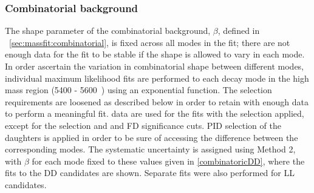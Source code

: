 \subsubsection{Combinatorial background}

The shape parameter of the combinatorial background, $\beta$, defined in \sect~\ref{sec:massfit:combinatorial}, is fixed across all \Dz modes in the \CP fit; there are not enough data for the fit to be stable if the shape is allowed to vary in each mode. In order ascertain the variation in combinatorial shape between different \Dz modes, individual maximum likelihood fits are performed to each \Dz decay mode in the high \Bm mass region (5400 - 5600~\mevcc) using an exponential function. The selection requirements are loosened as described below in order to retain with enough data to perform a meaningful fit. \runone data are used for the fits with the selection applied, except for the \Kstarm selection and \Dz and \KS FD significance cuts. PID selection of the \Dz daughters is applied in order to be sure of accessing the difference between the corresponding \Dz modes. The systematic uncertainty is assigned using Method 2, with $\beta$ for each \Dz mode fixed to these values given in \fig\ref{combinatoricDD}, where the fits to the DD candidates are shown. Separate fits were also performed for LL candidates.



